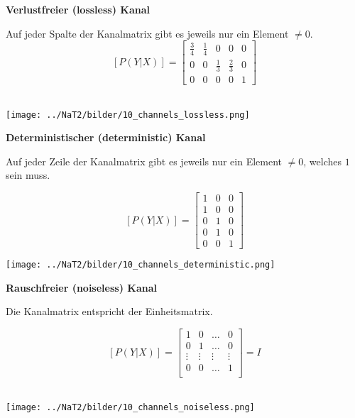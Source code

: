 \textbf{Verlustfreier (lossless) Kanal} \\
\begin{minipage}{14cm}
	Auf jeder Spalte der Kanalmatrix gibt es jeweils nur ein  Element $\neq 0$. \\

	$$ [P(Y | X)] = \begin{bmatrix}
              \frac34 & \frac14 & 0 & 0 & 0 \\
              0 & 0 & \frac13 & \frac23 & 0 \\
              0 & 0 & 0 & 0 & 1
           \end{bmatrix}$$ \\
\end{minipage}
\begin{minipage}{4cm}
\begin{center}
	\texttt{[image: ../NaT2/bilder/10\_channels\_lossless.png]}
\end{center}
\end{minipage}

\textbf{Deterministischer (deterministic) Kanal} \\
\begin{minipage}{14cm}
	Auf jeder Zeile der Kanalmatrix gibt es jeweils nur ein  Element $\neq 0$, welches $1$ sein
	muss.

	$$ [P(Y | X)] = \begin{bmatrix}
           		1 & 0 & 0 \\
           		1 & 0 & 0 \\
           		0 & 1 & 0 \\
           		0 & 1 & 0 \\
           		0 & 0 & 1
           \end{bmatrix}$$
\end{minipage}
\begin{minipage}{4cm}
\begin{center}
	\texttt{[image: ../NaT2/bilder/10\_channels\_deterministic.png]}
\end{center}
\end{minipage}

\textbf{Rauschfreier (noiseless) Kanal} \\
\begin{minipage}{14cm}
	Die Kanalmatrix entspricht der Einheitsmatrix.

	$$ [P(Y | X)] = \begin{bmatrix}
           		1 & 0 & \ldots & 0\\
           		0 & 1 & \ldots & 0\\
           		\vdots & \vdots & \vdots & \vdots \\
           		0 & 0 & \ldots & 1\\
           \end{bmatrix} = I$$ \\
\end{minipage}
\begin{minipage}{4cm}
\begin{center}
	\texttt{[image: ../NaT2/bilder/10\_channels\_noiseless.png]}
\end{center}
\end{minipage}

